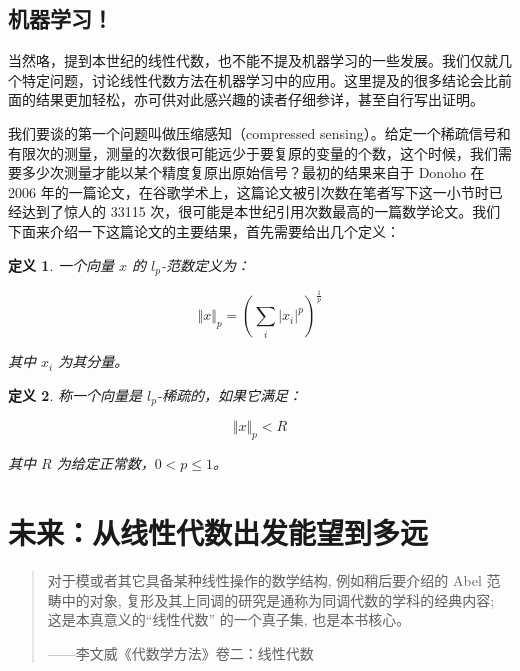 \documentclass{ctexbook}
\newtheorem{definition}{定义}[chapter] %
\begin{document}
\subsection{机器学习！}

当然咯，提到本世纪的线性代数，也不能不提及机器学习的一些发展。我们仅就几个特定问题，讨论线性代数方法在机器学习中的应用。这里提及的很多结论会比前面的结果更加轻松，亦可供对此感兴趣的读者仔细参详，甚至自行写出证明。

我们要谈的第一个问题叫做压缩感知（compressed sensing）。给定一个稀疏信号和有限次的测量，测量的次数很可能远少于要复原的变量的个数，这个时候，我们需要多少次测量才能以某个精度复原出原始信号？最初的结果来自于 Donoho 在 2006 年的一篇论文，在谷歌学术上，这篇论文被引次数在笔者写下这一小节时已经达到了惊人的 33115 次，很可能是本世纪引用次数最高的一篇数学论文。我们下面来介绍一下这篇论文的主要结果，首先需要给出几个定义：

\begin{definition}
    一个向量 $x$ 的 $l_p$-范数定义为：

    \[
    \Vert x \Vert_p = \left( \sum_{i}|x_i|^p \right)^{\frac{1}{p}}
    \]

    其中 $x_i$ 为其分量。
\end{definition}

\begin{definition}
    称一个向量是 $l_p$-稀疏的，如果它满足：

    \[
    \Vert x \Vert_p < R
    \]

    其中 $R$ 为给定正常数，$0 < p \leqslant 1$。
\end{definition}



\section{未来：从线性代数出发能望到多远}

\begin{quote}

\kaishu
对于模或者其它具备某种线性操作的数学结构, 例如稍后要介绍的 Abel 范畴中的对象, 复形及其上同调的研究是通称为同调代数的学科的经典内容; 这是本真意义的“线性代数” 的一个真子集, 也是本书核心。

\begin{flushright}
    \kaishu
    ——李文威《代数学方法》卷二：线性代数
\end{flushright}
    
\end{quote}
\end{document}

